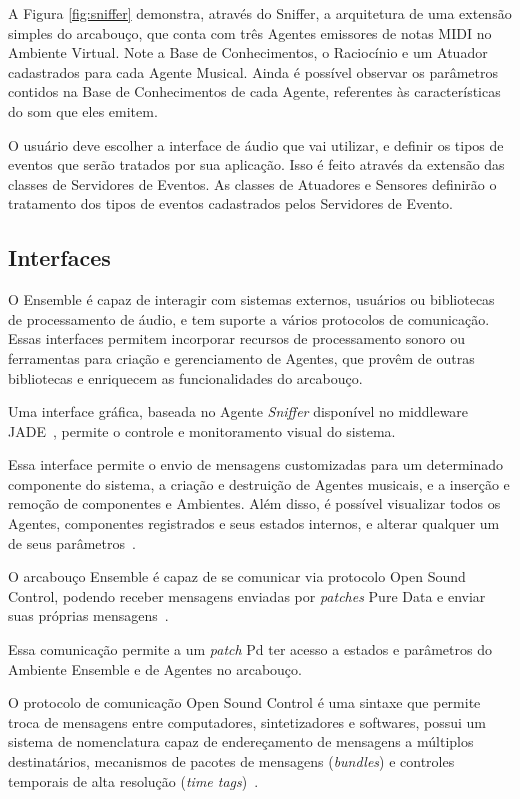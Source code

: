 \documentclass[a4paper, 11pt, twoside]{article}
\begin{document}
\begin{multicols}{2}
A Figura \ref{fig:sniffer} demonstra, através do Sniffer, a arquitetura 
de uma extensão simples
do arcabouço, que conta com três Agentes emissores de notas
MIDI no Ambiente Virtual. Note a Base de Conhecimentos, 
o Raciocínio e um Atuador cadastrados
para cada Agente Musical. Ainda é possível observar os
parâmetros contidos na Base de Conhecimentos de cada
Agente, referentes às características do som que eles emitem.

O usuário deve escolher a interface de áudio que vai utilizar,
e definir os tipos de eventos que serão tratados por sua aplicação.
Isso é feito através da extensão das classes de Servidores de Eventos.
As classes de Atuadores e Sensores definirão o tratamento dos tipos
de eventos cadastrados pelos Servidores de Evento.

\subsection{Interfaces}

O Ensemble é capaz de interagir com sistemas externos, usuários ou 
bibliotecas de processamento de áudio, e tem suporte a vários protocolos de 
comunicação. Essas interfaces permitem incorporar recursos de processamento 
sonoro ou ferramentas para criação e gerenciamento de Agentes, que provêm de 
outras bibliotecas e enriquecem as funcionalidades do arcabouço.

Uma interface gráfica, baseada no Agente \textit{Sniffer} disponível no 
middleware JADE~\cite{belli99}, permite o controle e monitoramento visual do 
sistema.

Essa interface permite o envio de mensagens customizadas para um determinado 
componente do sistema, a criação e destruição de Agentes musicais, e a inserção
e remoção de componentes e Ambientes. Além disso, é possível visualizar todos 
os Agentes, componentes registrados e seus estados internos, e alterar qualquer
um de seus parâmetros~\cite{leandro11}.

O arcabouço Ensemble é capaz de se comunicar via protocolo Open Sound 
Control, podendo receber mensagens enviadas por \textit{patches}
Pure Data e enviar suas próprias mensagens~\cite{leandro11}. 

Essa comunicação permite a um \textit{patch} Pd ter acesso a estados e 
parâmetros do Ambiente Ensemble e de Agentes no arcabouço.

O protocolo de comunicação Open Sound Control é uma sintaxe que permite troca 
de mensagens entre computadores, sintetizadores e softwares, possui um sistema 
de nomenclatura capaz de endereçamento de mensagens a múltiplos destinatários, 
mecanismos de pacotes de mensagens (\textit{bundles}) e controles 
temporais de alta resolução (\textit{time tags})~\cite{wright97}.


\end{multicols}
\end{document}

